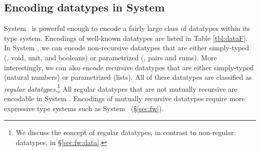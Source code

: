 \subsection{Encoding datatypes in System \F}
\label{sec:f:data}
System \F\ is  powerful enough to encode a fairly large class of datatypes
within its type system. Encodings of well-known datatypes are listed in
Table \ref{tbl:dataF}. In System \F, we can encode non-recursive datatypes
that are either simply-typed (\eg, void, unit, and booleans)
or parametrized (\eg, pairs and sums).
More interestingly, we can also encode recursive datatypes
that are either simply-typed (natural numbers) or parametrized (lists).
All of these datatypes are classified as \emph{regular datatypes}.\footnote{
	We discuss the concept of regular datatypes,
	in contrast to non-regular datatypes, in \S\ref{sec:fw:data}. }
All regular datatypes that are not mutually recursive are encodable
in System \F. Encodings of mutually recursive datatypes require
more expressive type systems such as System \Fw\ (\S\ref{sec:fw}).

